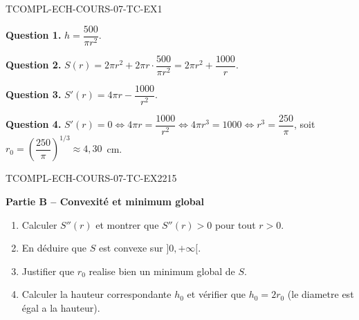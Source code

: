 \begin{corrige}{TCOMPL-ECH-COURS-07-TC-EX1}

\textbf{Question 1.} $h = \dfrac{500}{\pi r^2}$.

\textbf{Question 2.} $S(r) = 2\pi r^2 + 2\pi r \cdot \dfrac{500}{\pi r^2} = 2\pi r^2 + \dfrac{1000}{r}$.


\textbf{Question 3.} $S'(r) = 4\pi r - \dfrac{1000}{r^2}$.

\textbf{Question 4.} $S'(r) = 0 \iff 4\pi r = \dfrac{1000}{r^2} \iff 4\pi r^3 = 1000 \iff r^3 = \dfrac{250}{\pi}$, soit $r_0 = \left(\dfrac{250}{\pi}\right)^{1/3} \approx 4{,}30$~cm.

\end{corrige}

\bigskip


\begin{exercice}{TCOMPL-ECH-COURS-07-TC-EX2}{2}{15}

\textbf{Partie B -- Convexité et minimum global}

\begin{enumerate}
  \item Calculer $S''(r)$ et montrer que $S''(r) > 0$ pour tout $r > 0$.
  \item En déduire que $S$ est convexe sur $]0, +\infty[$.
  \item Justifier que $r_0$ realise bien un minimum global de $S$.
  \item Calculer la hauteur correspondante $h_0$ et vérifier que $h_0 = 2r_0$ (le diametre est égal a la hauteur).
\end{enumerate}

\end{exercice}

